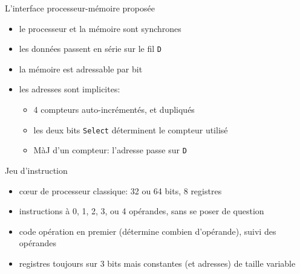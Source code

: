 \documentclass[slidetop,11pt,table]{beamer}
\begin{document}
\begin{frame}{L'interface processeur-mémoire proposée}
  \begin{figure}[b]
    \begin{center}
      \scalebox{0.8}{\proco}
    \end{center}
  \end{figure}
  \begin{itemize}
  \item le processeur et la mémoire sont synchrones
  \item les données passent en série sur le fil \texttt{D}
  \item la mémoire est adressable par bit
  \item les adresses sont implicites:
    \begin{itemize}
    \item 4 compteurs auto-incrémentés, et dupliqués
    \item les deux bits \texttt{Select} déterminent le compteur utilisé
    \item MàJ d'un compteur: l'adresse passe sur  \texttt{D}
    \end{itemize}
  \end{itemize}
\end{frame}




\begin{frame}{Jeu d'instruction}
  \begin{itemize}
  \item cœur de processeur classique: 32 ou 64 bits, 8 registres
  \item instructions à 0, 1, 2, 3, ou 4 opérandes, sans se poser de question
  \item code opération en premier (détermine combien d'opérande), suivi des opérandes
  \item registres toujours sur 3 bits mais constantes (et adresses) de taille variable
  \end{itemize}
\end{frame}
\end{document}
